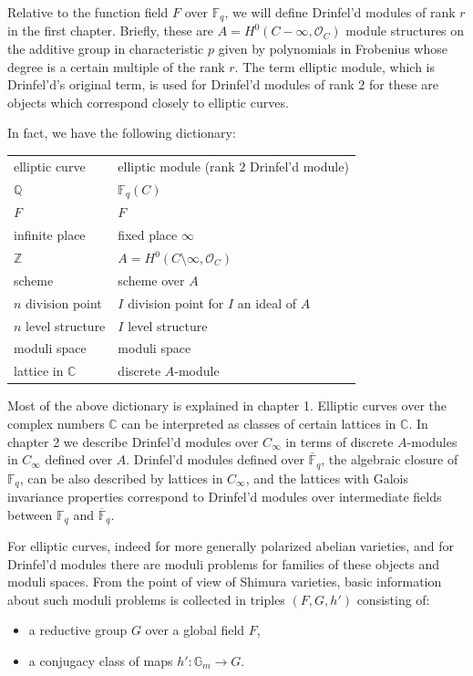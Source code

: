 \documentclass[12pt,a4paper]{article}
\theoremstyle{plain}
\theoremstyle{definition}
\theoremstyle{remark}
\newcommand{\bF}{\mathbb{F}}
\newcommand{\bQ}{\mathbb{Q}}
\newcommand{\bC}{\mathbb{C}}
\newcommand{\bZ}{\mathbb{Z}}
\newcommand{\cO}{\mathcal{O}}
\providecommand{\cO}{\mathcal{O}}
\begin{document}
Relative to the function field $F$ over $\bF_q$, we will define Drinfel'd modules of rank $r$ in the first chapter. Briefly, these are $A = H^0(C - \infty, \cO_C)$ module structures on the additive group in characteristic $p$ given by polynomials in Frobenius whose degree is a certain multiple of the rank $r$. The term elliptic module, which is Drinfel'd's original term, is used for Drinfel'd modules of rank $2$ for these are objects which correspond closely to elliptic curves.

In fact, we have the following dictionary:

\begin{center}
\begin{tabular}{ll}
elliptic curve & elliptic module (rank $2$ Drinfel'd module) \\
$\bQ$ & $\bF_q(C)$ \\
$F$ & $F$ \\
infinite place & fixed place $\infty$ \\
$\bZ$ & $A = H^0(C \setminus \infty, \cO_C)$ \\
scheme & scheme over $A$ \\
$n$ division point & $I$ division point for $I$ an ideal of $A$ \\
$n$ level structure & $I$ level structure \\
moduli space & moduli space \\
lattice in $\bC$ & discrete $A$-module
\end{tabular}
\end{center}

Most of the above dictionary is explained in chapter 1. Elliptic curves over the complex numbers $\bC$ can be interpreted as classes of certain lattices in $\bC$. In chapter 2 we describe Drinfel'd modules over $C_\infty$ in terms of discrete $A$-modules in $C_\infty$ defined over $A$. Drinfel'd modules defined over $\overline{\bF}_q$, the algebraic closure of $\bF_q$, can be also described by lattices in $C_\infty$, and the lattices with Galois invariance properties correspond to Drinfel'd modules over intermediate fields between $\bF_q$ and $\overline{\bF}_q$.

For elliptic curves, indeed for more generally polarized abelian varieties, and for Drinfel'd modules there are moduli problems for families of these objects and moduli spaces. From the point of view of Shimura varieties, basic information about such moduli problems is collected in triples $(F, G, h')$ consisting of:
\begin{itemize}
\item a reductive group $G$ over a global field $F$,
\item a conjugacy class of maps $h': \mathbb{G}_m \to G$.
\end{itemize}
\end{document}

